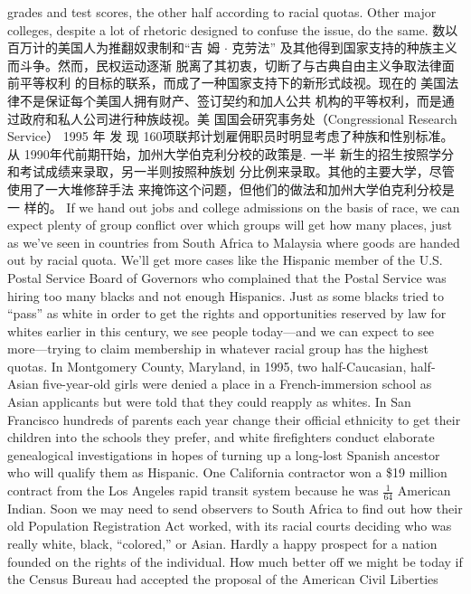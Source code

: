 \begin{paracol}{2}
grades and test scores, the other half according to racial quotas.
Other major colleges, despite a lot of rhetoric designed to confuse the issue, do the same.
\switchcolumn
数以百万计的美国人为推翻奴隶制和“吉 姆 $\cdot$ 克劳法”
及其他得到国家支持的种族主义而斗争。然而，民权运动逐渐
脱离了其初衷，切断了与古典自由主义争取法律面前平等权利
的目标的联系，而成了一种国家支持下的新形式歧视。现在的
美国法律不是保证每个美国人拥有财产、签订契约和加人公共
机构的平等权利，而是通过政府和私人公司进行种族歧视。美
国国会研究事务处（Congressional Research Service） 1995 年
发 现 160项联邦计划雇佣职员时明显考虑了种族和性别标准。从 1990年代前期幵始，加州大学伯克利分校的政策是. 一半
新生的招生按照学分和考试成绩来录取，另一半则按照种族划
分比例来录取。其他的主要大学，尽管使用了一大堆修辞手法
来掩饰这个问题，但他们的做法和加州大学伯克利分校是一
样的。
\switchcolumn*
If we hand out jobs and college admissions on the basis of
race, we can expect plenty of group conflict over which groups
will get how many places, just as we've seen in countries from
South Africa to Malaysia where goods are handed out by racial
quota. We'll get more cases like the Hispanic member of the
U.S. Postal Service Board of Governors who complained that
the Postal Service was hiring too many blacks and not enough
Hispanics. Just as some blacks tried to ``pass'' as white in order
to get the rights and opportunities reserved by law for whites
earlier in this century, we see people today---and we can expect
to see more---trying to claim membership in whatever racial
group has the highest quotas. In Montgomery County, Maryland, in 1995, two half-Caucasian, half-Asian five-year-old girls
were denied a place in a French-immersion school as Asian applicants but were told that they could reapply as whites. In San
Francisco hundreds of parents each year change their official
ethnicity to get their children into the schools they prefer, and
white firefighters conduct elaborate genealogical investigations
in hopes of turning up a long-lost Spanish ancestor who will
qualify them as Hispanic. One California contractor won a \$19
million contract from the Los Angeles rapid transit system because he was $\frac{1}{64}$ American Indian. Soon we may need to send
observers to South Africa to find out how their old Population
Registration Act worked, with its racial courts deciding who
was really white, black, ``colored,'' or Asian. Hardly a happy
prospect for a nation founded on the rights of the individual.
How much better off we might be today if the Census Bureau had accepted the proposal of the American Civil Liberties

\end{paracol}
